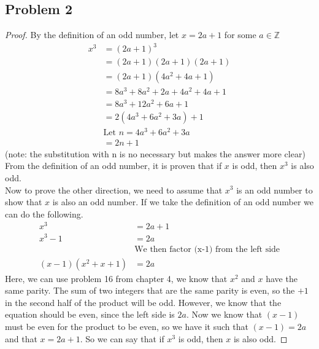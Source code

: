 \documentclass[12pt]{article}
\newcommand{\Z}{\mathbb{Z}}
\begin{document}
\subsection*{Problem 2}
\begin{proof}
By the definition of an odd number, let $x = 2a + 1$ for some $a \in \Z$ 
\begin{align*}
x^3 &= (2a + 1)^3\\
&= (2a + 1)(2a + 1)(2a + 1)\\
&= (2a + 1)(4a^2 + 4a + 1)\\
&= 8a^3 + 8a^2 + 2a + 4a^2 + 4a + 1\\
&= 8a^3 + 12a^2 + 6a + 1\\
&= 2(4a^3 + 6a^2 + 3a) + 1\\
&\text{Let } n = 4a^3 + 6a^2 + 3a\\
&= 2n + 1
\end{align*}
(note: the substitution with n is no necessary but makes the answer more clear)\\
From the definition of an odd number, it is proven that if $x$ is odd, then $x^3$ is also odd.\\

Now to prove the other direction, we need to assume that $x^3$ is an odd number to show that $x$ is also an odd number. If we take the definition of an odd number we can do the following.
\begin{align*}
x^3 &= 2a + 1\\
x^3 - 1&= 2a\\
&\text{We then factor (x-1) from the left side}\\
(x-1)(x^2 + x + 1) &= 2a
\end{align*}
Here, we can use problem 16 from chapter 4, we know that $x^2$ and $x$ have the same parity. The sum of two integers that are the same parity is even, so the $+1$ in the second half of the product will be odd. However, we know that the equation should be even, since the left side is $2a$. Now we know that $(x-1)$ must be even for the product to be even, so we have it such that $(x-1) = 2a$ and that $x = 2a + 1$. So we can say that if $x^3$ is odd, then $x$ is also odd.
\end{proof}


\newpage
\end{document}
